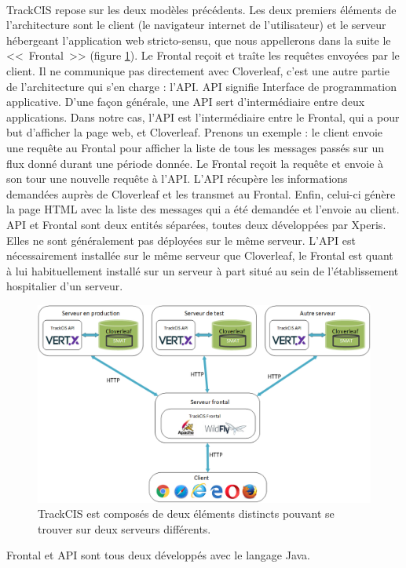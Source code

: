 			\paragraph{}%
			TrackCIS repose sur les deux modèles précédents. Les deux
			premiers éléments de l'architecture sont le client (le navigateur internet
			de l'utilisateur) et le serveur hébergeant l'application web stricto-sensu,
			que nous appellerons dans la suite le <<~Frontal~>> (figure
			\ref{archi_trackcis}).
			Le Frontal reçoit et traîte les requêtes envoyées par le client. Il
			ne communique pas directement avec Cloverleaf, c'est une autre partie de
			l'architecture qui s'en charge : l'API.
			API signifie Interface de programmation applicative. D'une façon générale,
			une API sert d'intermédiaire entre deux applications. Dans notre cas, l'API est
			l'intermédiaire entre le Frontal, qui a pour but d'afficher la page web, et
			Cloverleaf. Prenons un exemple : le client envoie une requête au Frontal
			pour afficher la liste de tous les messages passés sur un flux donné durant
			une période donnée. Le Frontal reçoit la requête et envoie à son tour une
			nouvelle requête à l'API.
			L'API récupère les informations demandées auprès de Cloverleaf et
			les transmet au Frontal. Enfin, celui-ci génère la page HTML avec la liste
			des messages qui a été demandée et l'envoie au client.\newline
			API et Frontal sont deux entités séparées, toutes deux développées par
			Xperis. Elles ne sont généralement pas déployées sur le même serveur. L'API
			est nécessairement installée sur le même serveur que Cloverleaf, le Frontal est
			quant à lui habituellement installé sur un serveur à part situé au
			sein de l'établissement hospitalier d'un serveur.
			\begin{figure}[H]%
				\centering
				\includegraphics[width=14cm]{../img/part3/archi_trackcis.png}
				\caption{\label{archi_trackcis} TrackCIS est composés de deux éléments
				distincts pouvant se trouver sur deux serveurs différents.}
			\end{figure}
			Frontal et API sont tous deux développés avec le langage Java.
			
